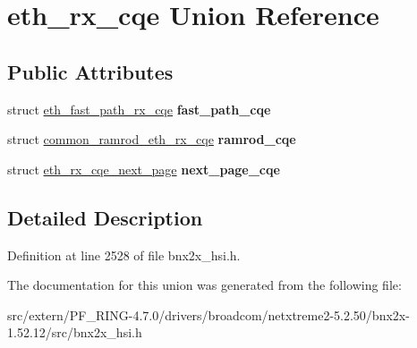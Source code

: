 \hypertarget{unioneth__rx__cqe}{
\section{eth\_\-rx\_\-cqe Union Reference}
\label{unioneth__rx__cqe}
}
\subsection*{Public Attributes}
\begin{DoxyCompactItemize}
\item 
\hypertarget{unioneth__rx__cqe_a65983d953305bb458fd44260e7cc9c5d}{
struct \hyperlink{structeth__fast__path__rx__cqe}{eth\_\-fast\_\-path\_\-rx\_\-cqe} {\bfseries fast\_\-path\_\-cqe}}
\label{unioneth__rx__cqe_a65983d953305bb458fd44260e7cc9c5d}

\item 
\hypertarget{unioneth__rx__cqe_a48c30e270484ea688b55a36f05fbb972}{
struct \hyperlink{structcommon__ramrod__eth__rx__cqe}{common\_\-ramrod\_\-eth\_\-rx\_\-cqe} {\bfseries ramrod\_\-cqe}}
\label{unioneth__rx__cqe_a48c30e270484ea688b55a36f05fbb972}

\item 
\hypertarget{unioneth__rx__cqe_a93222191ab96f4d4f9879ce00e036b0e}{
struct \hyperlink{structeth__rx__cqe__next__page}{eth\_\-rx\_\-cqe\_\-next\_\-page} {\bfseries next\_\-page\_\-cqe}}
\label{unioneth__rx__cqe_a93222191ab96f4d4f9879ce00e036b0e}

\end{DoxyCompactItemize}


\subsection{Detailed Description}


Definition at line 2528 of file bnx2x\_\-hsi.h.



The documentation for this union was generated from the following file:\begin{DoxyCompactItemize}
\item 
src/extern/PF\_\-RING-\/4.7.0/drivers/broadcom/netxtreme2-\/5.2.50/bnx2x-\/1.52.12/src/bnx2x\_\-hsi.h\end{DoxyCompactItemize}
